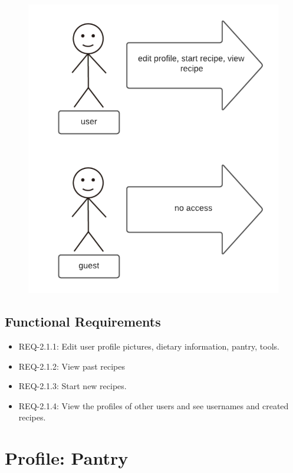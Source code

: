 \documentclass{scrreprt}
\begin{document}
\begin{figure}[H]\centering
    \includegraphics[width=\columnwidth]{response diagrams/Profile.png}
\end{figure}

\subsection{\gls{Functional Requirements}}

\begin{itemize}
    \item REQ-2.1.1: Edit user profile pictures, dietary information, pantry, tools.
    \item REQ-2.1.2: View past recipes
    \item REQ-2.1.3: Start new recipes.
    \item REQ-2.1.4: View the profiles of other users and see usernames and created recipes.
\end{itemize}

\section{Profile: Pantry}
\end{document}
